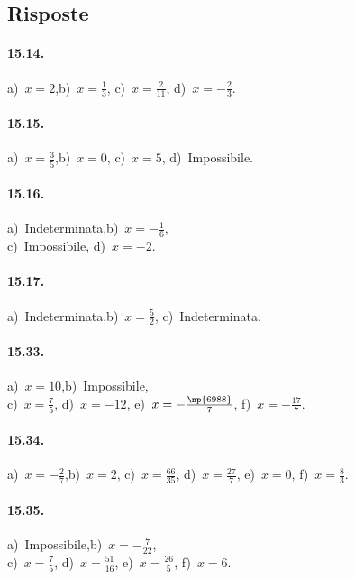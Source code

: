 \subsection{Risposte}
\begin{multicols}{2}
\paragraph{15.14.}
a)~$x=2$,\quad b)~$x=\frac{1}{3}$, \quad c)~$x=\frac{2}{11}$, \quad d)~$x=-\frac{2}{3}$.

\paragraph{15.15.}
a)~$x=\frac{3}{5}$,\quad b)~$x=0$, \quad c)~$x=5$, \quad d)~Impossibile.

\paragraph{15.16.}
a)~Indeterminata,\quad b)~$x=-\frac{1}{6}$, \protect\\ c)~Impossibile, \quad d)~$x=-2$.

\paragraph{15.17.}
a)~Indeterminata,\quad b)~$x=\frac{5}{2}$, \quad c)~Indeterminata.

\paragraph{15.33.}
a)~$x=10$,\quad b)~Impossibile, \protect\\ c)~$x=\frac{7}{5}$, \quad d)~$x=-12$, \quad e)~$x=-\frac{\np{6988}}{7}$, \quad f)~$x=-\frac{17}{7}$.

\paragraph{15.34.}
a)~$x=-{\frac{2}{7}}$,\quad b)~$x=2$, \quad c)~$x=\frac{66}{35}$, \quad d)~$x=\frac{27}{7}$, \quad e)~$x=0$, \quad f)~$x=\frac{8}{3}$.

\paragraph{15.35.}
a)~Impossibile,\quad b)~$x=-{\frac{7}{22}}$, \protect\\ c)~$x=\frac{7}{5}$, \quad d)~$x=\frac{51}{16}$, \quad e)~$x=\frac{26}{5}$, \quad f)~$x=6$.


\end{multicols}
